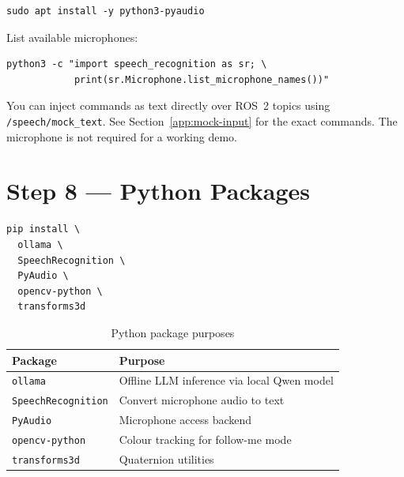 \documentclass[12pt,a4paper]{report}
\newcommand{\topic}[1]{\texttt{\color{purple!80!black}#1}}
\begin{document}
\begin{lstlisting}[style=bashstyle]
sudo apt install -y python3-pyaudio
\end{lstlisting}

List available microphones:

\begin{lstlisting}[style=bashstyle]
python3 -c "import speech_recognition as sr; \
            print(sr.Microphone.list_microphone_names())"
\end{lstlisting}

\begin{tcolorbox}[tipbox, title=No Microphone?]
  You can inject commands as text directly over ROS~2 topics using
  \topic{/speech/mock\_text}.  See Section~\ref{app:mock-input} for the
  exact commands.  The microphone is not required for a working demo.
\end{tcolorbox}

\section{Step 8 --- Python Packages}

\begin{lstlisting}[style=bashstyle, caption={Install all Python dependencies}]
pip install \
  ollama \
  SpeechRecognition \
  PyAudio \
  opencv-python \
  transforms3d
\end{lstlisting}

\begin{table}[H]
  \centering
  \caption{Python package purposes}
  \begin{tabularx}{\linewidth}{L{4cm} X}
    \toprule
    \textbf{Package} & \textbf{Purpose} \\
    \midrule
    \texttt{ollama}           & Offline LLM inference via local Qwen model \\
    \texttt{SpeechRecognition} & Convert microphone audio to text \\
    \texttt{PyAudio}          & Microphone access backend \\
    \texttt{opencv-python}    & Colour tracking for follow-me mode \\
    \texttt{transforms3d}     & Quaternion utilities \\
    \bottomrule
  \end{tabularx}
\end{table}
\end{document}
